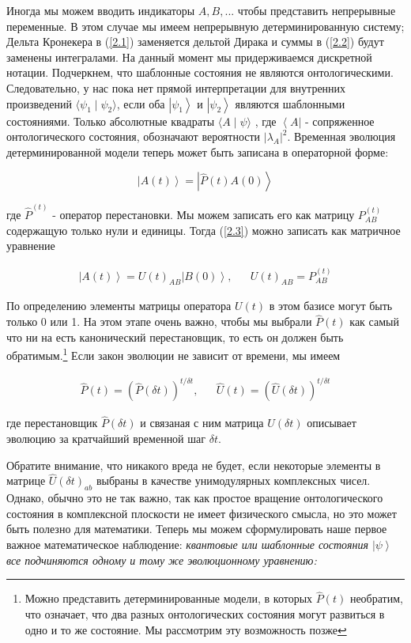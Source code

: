 \documentclass[main.tex]{subfiles}
\begin{document}
Иногда мы можем вводить индикаторы $A,B,...$ чтобы представить непрерывные переменные. В этом случае мы имеем непрерывную детерминированную систему; Дельта Кронекера в (\ref{2.1}) заменяется дельтой Дирака и суммы в (\ref{2.2}) будут заменены интегралами. На данный момент мы придерживаемся дискретной нотации. Подчеркнем, что шаблонные состояния не являются онтологическими. Следовательно, у нас пока нет прямой интерпретации для внутренних произведений $\langle\psi_1\mid\psi_2\rangle$, если оба $\left|\psi_1\right>$ и $\left|\psi_2\right>$ являются шаблонными состояниями. Только абсолютные квадраты $\langle A\mid \psi\rangle $ , где $\left<A\right|$ - сопряженное онтологического состояния, обозначают вероятности $|\lambda_A|^2$. Временная эволюция детерминированной модели теперь может быть записана в операторной форме: 

\begin{equation}\label{2.3}
	\left|A(t)\right> = \left|\hat P(t)A(0)\right>
\end{equation}

где $\hat P^{(t)}$ - оператор перестановки. Мы можем записать его как матрицу $P^{(t)}_{AB}$ содержащую только нули и единицы. Тогда (\ref{2.3}) можно записать как матричное уравнение

\begin{align}\label{2.4}
	\left|A(t)\right> = U(t)_{AB}\left|B(0)\right>, &&
	U(t)_{AB} = P^{(t)}_{AB}
\end{align}

По определению элементы матрицы оператора $U(t)$ в этом базисе могут быть только 0 или 1.
На этом этапе очень важно, чтобы мы выбрали $\hat P(t)$ как самый что ни на есть канонический перестановщик, то есть он должен быть обратимым.\footnote{Можно представить детерминированные модели, в которых $\hat P(t)$ необратим, что означает, что два разных онтологических состояния могут развиться в одно и то же состояние. Мы рассмотрим эту возможность позже} Если закон эволюции не зависит от времени, мы имеем

\begin{align}\label{2.5}
	\hat P(t) = (\hat P(\delta t))^{t/\delta t}, && 
	\hat U(t) = (\hat U(\delta t))^{t/\delta t}
\end{align}

где перестановщик $\hat P(\delta t)$ и связаная с ним матрица $\hat U(\delta t)$ описывает эволюцию за кратчайший временной шаг $\delta t$.

Обратите внимание, что никакого вреда не будет, если некоторые элементы в матрице $\hat U(\delta t)_{ab}$ выбраны в качестве унимодулярных комплексных чисел. Однако, обычно это не так важно, так как простое вращение онтологического состояния в комплексной плоскости не имеет физического смысла, но это может быть полезно для математики.
Теперь мы можем сформулировать наше первое важное математическое наблюдение: \textit{квантовые или шаблонные состояния $\left|\psi\right>$ все подчиняются одному и тому же эволюционному уравнению:}
\end{document}

